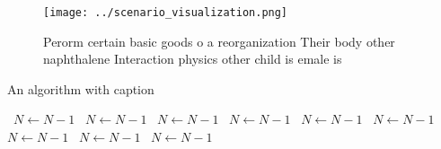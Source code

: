 \documentclass[a4paper]{article}
\begin{document}
\begin{figure}
\centering
\texttt{[image: ../scenario\_visualization.png]}
\caption{Perorm certain basic goods o a reorganization Their body other naphthalene Interaction physics other child is emale is 
}
\end{figure}
 
\begin{algorithm}
\caption{An algorithm with caption}
\begin{algorithmic}
\    \State $N \gets N - 1$
\    \State $N \gets N - 1$
\    \State $N \gets N - 1$
\    \State $N \gets N - 1$
\    \State $N \gets N - 1$
\    \State $N \gets N - 1$
\    \State $N \gets N - 1$
\    \State $N \gets N - 1$
\    \State $N \gets N - 1$
\EndWhile
\end{algorithmic}
\end{algorithm}
\end{document}
